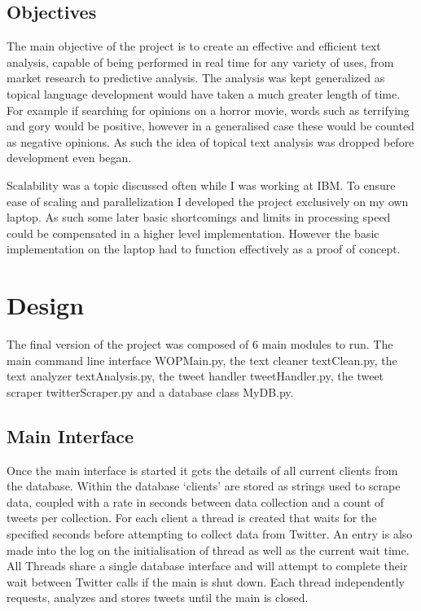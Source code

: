 \documentclass[12pt,a4paper]{report}
\begin{document}
  \section{Objectives}
    The main objective of the project is to create an effective and efficient text analysis, capable of being performed in real time for any variety of uses, from market research to predictive analysis. The analysis was kept generalized as topical language development would have taken a much greater length of time. For example if searching for opinions on a horror movie, words such as terrifying and gory would be positive, however in a generalised case these would be counted as negative opinions. As such the idea of topical text analysis was dropped before development even began. 
    \par
    Scalability was a topic discussed often while I was working at IBM. To ensure ease of scaling and parallelization I developed the project exclusively on my own laptop. As such some later basic shortcomings and limits in processing speed could be compensated in a higher level implementation. However the basic implementation on the laptop had to function effectively as a proof of concept.

\chapter{Design}
  The final version of the project was composed of 6 main modules to run. The main command line interface WOPMain.py\cite{SourceCode}, the text cleaner textClean.py\cite{SourceCode}, the text analyzer textAnalysis.py\cite{SourceCode}, the tweet handler tweetHandler.py\cite{SourceCode}, the tweet scraper twitterScraper.py\cite{SourceCode} and a database class MyDB.py\cite{SourceCode}.
  \section{Main Interface}
  Once the main interface is started it gets the details of all current clients from the database. Within the database ‘clients’ are stored as strings used to scrape data, coupled with a rate in seconds between data collection and a count of tweets per collection. For each client a thread is created that waits for the specified seconds before attempting to collect data from Twitter. An entry is also made into the log on the initialisation of thread as well as the current wait time. All Threads share a single database interface and will attempt to complete their wait between Twitter calls if the main is shut down. Each thread independently requests, analyzes and stores tweets until the main is closed.
\end{document}
